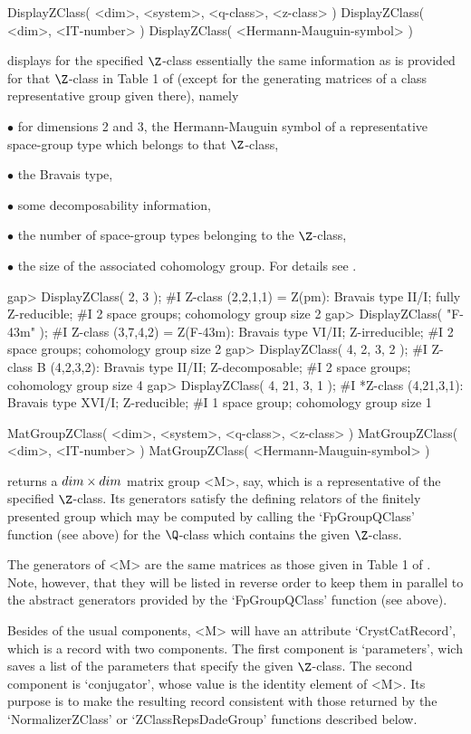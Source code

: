 \>DisplayZClass( <dim>, <system>, <q-class>, <z-class> )
\>DisplayZClass( <dim>, <IT-number> )
\>DisplayZClass( <Hermann-Mauguin-symbol> )

displays for the specified $\Z$-class essentially the same information
as is provided for that $\Z$-class in Table 1 of \cite{BBNWZ78}
(except for the generating matrices of a class representative group
given there), namely
\beginlist%
\item{$\bullet$} for  dimensions 2 and 3, the  Hermann-Mauguin symbol of a
    representative space-group type  which belongs  to that $\Z$-class,
\item{$\bullet$} the Bravais type,
\item{$\bullet$} some decomposability information,
\item{$\bullet$} the number of space-group types belonging to the $\Z$-class,
\item{$\bullet$} the size of the associated cohomology group.
\endlist
For details see \cite{BBNWZ78}.

\beginexample
gap> DisplayZClass( 2, 3 );
#I    Z-class (2,2,1,1) = Z(pm): Bravais type II/I; fully Z-reducible;
#I     2 space groups; cohomology group size 2
gap> DisplayZClass( "F-43m" );
#I    Z-class (3,7,4,2) = Z(F-43m): Bravais type VI/II; Z-irreducible;
#I     2 space groups; cohomology group size 2
gap> DisplayZClass( 4, 2, 3, 2 );
#I    Z-class B (4,2,3,2): Bravais type II/II; Z-decomposable;
#I     2 space groups; cohomology group size 4
gap> DisplayZClass( 4, 21, 3, 1 );
#I   *Z-class (4,21,3,1): Bravais type XVI/I; Z-reducible;
#I     1 space group; cohomology group size 1
\endexample

\>MatGroupZClass( <dim>, <system>, <q-class>, <z-class> )
\>MatGroupZClass( <dim>, <IT-number> )
\>MatGroupZClass( <Hermann-Mauguin-symbol> )

returns a $dim \times dim$ matrix group <M>, say, which is a
representative of the specified $\Z$-class.  Its generators satisfy
the defining relators of the finitely presented group which may be
computed by calling the `FpGroupQClass' function (see above) for the
$\Q$-class which contains the given $\Z$-class.

The generators of <M> are the same matrices as those given  in Table 1 of
\cite{BBNWZ78}. Note, however, that they will  be listed in reverse order
to  keep them  in parallel  to  the abstract  generators provided by  the
`FpGroupQClass' function (see above).

Besides of the usual components, <M> will have an attribute
`CrystCatRecord', which is a record with two components.  The
first component is `parameters', wich saves a list of the parameters
that specify the given $\Z$-class. The second component is
`conjugator', whose value is the identity element of <M>. Its purpose
is to make the resulting record consistent with those returned by
the `NormalizerZClass' or `ZClassRepsDadeGroup' functions described
below.

